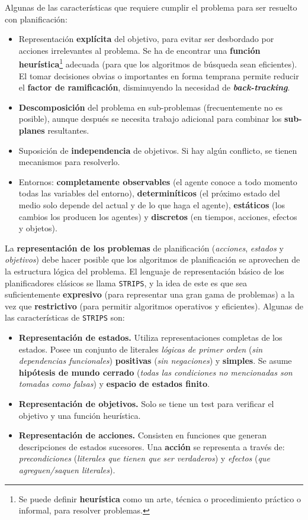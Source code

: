 \documentclass[10pt,a4paper]{article}
\begin{document}
Algunas de las características que requiere cumplir el problema para ser resuelto con planificación:
\begin{itemize}
\item Representación \textbf{explícita} del objetivo, para evitar ser desbordado por acciones irrelevantes al problema. Se ha de encontrar una \textbf{función heurística}\footnote{Se puede definir \textbf{heurística} como un arte, técnica o procedimiento práctico o informal, para resolver problemas.} adecuada (para que los algoritmos de búsqueda sean eficientes). El tomar decisiones obvias o importantes en forma temprana permite reducir el \textbf{factor de ramificación}, disminuyendo la necesidad de \textbf{\textit{back-tracking}}.
\item \textbf{Descomposición} del problema en sub-problemas (frecuentemente no es posible), aunque después se necesita trabajo adicional para combinar los \textbf{sub-planes} resultantes.
\item Suposición de \textbf{independencia} de objetivos. Si hay algún conflicto, se tienen mecanismos para resolverlo.
\item Entornos: \textbf{completamente observables} (el agente conoce a todo momento todas las variables del entorno), \textbf{determiníticos} (el próximo estado del medio solo depende del actual y de lo que haga el agente), \textbf{estáticos} (los cambios los producen los agentes) y \textbf{discretos} (en tiempos, acciones, efectos y objetos).
\end{itemize}

La \textbf{representación de los problemas} de planificación (\textit{acciones}, \textit{estados} y \textit{objetivos}) debe hacer posible que los algoritmos de planificación se aprovechen de la estructura lógica del problema. El lenguaje de representación básico de los planificadores clásicos se llama \texttt{STRIPS}, y la idea de este es que sea suficientemente \textbf{expresivo} (para representar una gran gama de problemas) a la vez que \textbf{restrictivo} (para permitir algoritmos operativos y eficientes). Algunas de las características de \texttt{STRIPS} son:
\begin{itemize}
\item \textbf{Representación de estados.} Utiliza representaciones completas de los estados. Posee un conjunto de literales \textit{lógicas de primer orden} (\textit{sin dependencias funcionales}) \textbf{positivas} (\textit{sin negaciones}) y \textbf{simples}. Se asume \textbf{hipótesis de mundo cerrado} (\textit{todas las condiciones no mencionadas son tomadas como falsas}) y \textbf{espacio de estados finito}.
\item \textbf{Representación de objetivos.} Solo se tiene un test para verificar el objetivo y una función heurística.
\item \textbf{Representación de acciones.} Consisten en funciones que generan descripciones de estados sucesores. Una \textbf{acción} se representa a través de: \textit{precondiciones} (\textit{literales que tienen que ser verdaderos}) y \textit{efectos} (\textit{que agreguen/saquen literales}).
\end{itemize}
\end{document}
